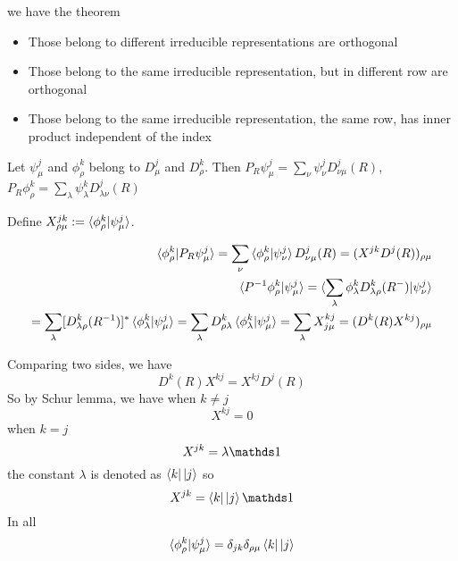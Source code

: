 we have the theorem
\begin{thm}[W-E]
    \begin{itemize}
        \item Those belong to different irreducible representations
            are orthogonal
        \item Those belong to the same irreducible representation, but
            in different row are orthogonal
        \item Those belong to the same irreducible representation, the
            same row, has inner product independent of the index
    \end{itemize}
\end{thm}

Let $\psi^j_\mu$ and $\phi^k_\rho$ belong to $D^j_\mu$ and $D^k_\rho$.
Then 
$P_R \psi^j_\mu= \sum_\nu \psi^j_\nu D^j_{\nu\mu}(R)$,
$P_R \phi^k_\rho= \sum_\lambda \psi^k_\lambda D^j_{\lambda\nu}(R)$

Define $X^{jk}_{\rho\mu} := \braket{\phi^k_\rho|\psi^j_\mu}$.

\begin{align}
    \braket{\phi^k_\rho|P_R\psi^j_\mu} = \sum_\nu
    \braket{\phi^k_\rho|\psi^j_\nu} D^j_{\nu\mu}(R) = (X^{jk}
    D^j(R))_{\rho\mu} \\
    \braket{P^{-1}\phi^k_\rho|\psi^j_\mu} = \braket{
    \sum_\lambda\phi^k_\lambda D^k_{\lambda\rho}(R^{-})|\psi^j_\nu}
    \\
    = \sum_\lambda [D^k_{\lambda\rho}(R^{-1})]^*
    \braket{\phi^k_\lambda|\psi^j_\mu} 
    = \sum_\lambda D^k_{\rho\lambda}
    \braket{\phi^k_\lambda|\psi^j_\mu}
    = \sum_\lambda X^{kj}_{j\mu} = (D^k(R)X^{kj})_{\rho\mu}
\end{align}

Comparing two sides, we have
\begin{equation}
    D^k(R) X^{kj} = X^{kj}D^j(R)
\end{equation}
So by Schur lemma, we have when $k\neq j$
\begin{equation}
    X^{kj} = 0
\end{equation}
when $k=j$
\begin{equation}
    X^{jk} = \lambda\id
\end{equation}
the constant $\lambda$ is denoted as $\bra{k}\ket{j}$
so
\begin{equation}
    X^{jk} = \bra{k} \ket{j} \id
\end{equation}
In all
\begin{equation}
    \braket{\phi^k_\rho|\psi^j_\mu} = \delta_{jk} \delta_{\rho\mu}
    \bra{k} \ket{j}
\end{equation}

